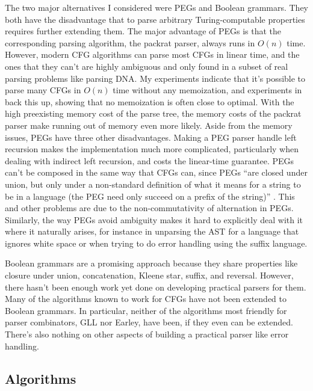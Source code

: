 \documentclass[12pt]{article}
\begin{document}
The two major alternatives I considered were PEGs and Boolean
grammars.  They both have the disadvantage that to parse arbitrary
Turing-computable properties requires further extending them.  The
major advantage of PEGs is that the corresponding parsing algorithm,
the packrat parser, always runs in $O(n)$ time.  However, modern CFG
algorithms can parse most CFGs in linear time, and the ones that they
can't are highly ambiguous and only found in a subset of real parsing
problems like parsing DNA.  My experiments indicate that it's possible
to parse many CFGs in $O(n)$ time without any memoization, and
experiments in \textcite{packrat_is_it_worth_it} back this up, showing
that no memoization is often close to optimal.  With the high
preexisting memory cost of the parse tree, the memory costs of the
packrat parser make running out of memory even more likely.  Aside
from the memory issues, PEGs have three other disadvantages.  Making a
PEG parser handle left recursion makes the implementation much more
complicated, particularly when dealing with indirect left recursion,
and costs the linear-time guarantee.  PEGs can't be composed in the
same way that CFGs can, since PEGs ``are closed under union, but only
under a non-standard definition of what it means for a string to be in
a language (the PEG need only succeed on a prefix of the
string)'' \parencite[p. 4]{yakker1}.  This and other problems are due
to the non-commutativity of alternation in PEGs.  Similarly, the way
PEGs avoid ambiguity makes it hard to explicitly deal with it where it
naturally arises, for instance in unparsing the AST for a language
that ignores white space or when trying to do error handling using the
suffix language.

Boolean grammars are a promising approach because they share
properties like closure under union, concatenation, Kleene star,
suffix, and reversal.  However, there hasn't been enough work yet done
on developing practical parsers for them.  Many of the algorithms
known to work for CFGs have not been extended to Boolean grammars.  In
particular, neither of the algorithms most friendly for parser
combinators, GLL nor Earley, have been, if they even can be extended.
There's also nothing on other aspects of building a practical parser
like error handling.


\subsection{Algorithms}
\label{sec:algorithms}
\end{document}
